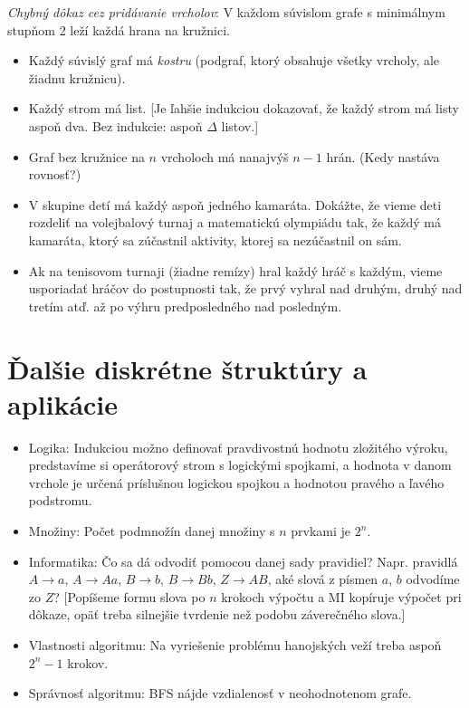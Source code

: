 \documentclass[a4paper, 11pt]{article}
\begin{document}
\emph{Chybný dôkaz cez pridávanie vrcholov}: V každom súvislom grafe s minimálnym stupňom 2 leží každá hrana na kružnici.

\begin{itemize}
\item Každý súvislý graf má \emph{kostru} (podgraf, ktorý obsahuje všetky vrcholy, ale žiadnu kružnicu).
\item Každý strom má list. [Je ľahšie indukciou dokazovať, že každý strom má listy aspoň dva. Bez indukcie: aspoň $\Delta$ listov.]
\item Graf bez kružnice na $n$ vrcholoch má nanajvýš $n-1$ hrán. (Kedy nastáva rovnosť?)
\item V skupine detí má každý aspoň jedného kamaráta. Dokážte, že vieme deti rozdeliť na volejbalový turnaj a matematickú olympiádu tak, že každý má kamaráta,
    ktorý sa zúčastnil aktivity, ktorej sa nezúčastnil on sám.
\item Ak na tenisovom turnaji (žiadne remízy) hral každý hráč s každým, vieme usporiadať hráčov do postupnosti tak, že prvý vyhral nad druhým, druhý nad tretím atď. až po výhru predposledného nad posledným.

\end{itemize}


\section{Ďalšie diskrétne štruktúry a aplikácie}

\begin{itemize}
\item Logika: Indukciou možno definovať pravdivostnú hodnotu zložitého výroku, predstavíme si operátorový strom s logickými spojkami, a hodnota v danom vrchole je určená príslušnou logickou spojkou a hodnotou pravého a ľavého podstromu.
\item Množiny: Počet podmnožín danej množiny s $n$ prvkami je $2^n$.
\item Informatika: Čo sa dá odvodiť pomocou danej sady pravidiel? Napr. pravidlá $A\to a$, $A\to Aa$, $B\to b$, $B\to Bb$, $Z\to AB$, aké slová z písmen $a$, $b$ odvodíme zo $Z$? [Popíšeme formu slova po $n$ krokoch výpočtu a MI kopíruje výpočet pri dôkaze, opäť treba silnejšie tvrdenie než podobu záverečného slova.]
\item Vlastnosti algoritmu: Na vyriešenie problému hanojských veží treba aspoň $2^n-1$ krokov.
\item Správnosť algoritmu: BFS nájde vzdialenosť v neohodnotenom grafe.
\end{itemize}
\end{document}
